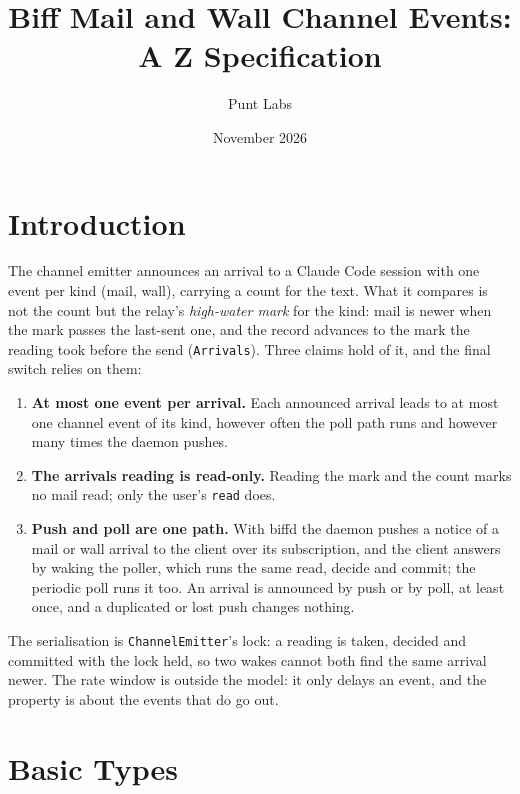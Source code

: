 \documentclass[a4paper,10pt,fleqn]{article}
\begin{document}
\title{Biff Mail and Wall Channel Events: A Z Specification}
\author{Punt Labs}
\date{November 2026}
\maketitle

\section{Introduction}

The channel emitter announces an arrival to a Claude Code session with one
event per kind (mail, wall), carrying a count for the text.  What it compares is
not the count but the relay's \emph{high-water mark} for the kind: mail is newer
when the mark passes the last-sent one, and the record advances to the mark the
reading took before the send (\texttt{Arrivals}).  Three claims hold of it, and
the final switch relies on them:

\begin{enumerate}
  \item \textbf{At most one event per arrival.}  Each announced arrival leads to
    at most one channel event of its kind, however often the poll path runs and
    however many times the daemon pushes.
  \item \textbf{The arrivals reading is read-only.}  Reading the mark and the count
    marks no mail read; only the user's \texttt{read} does.
  \item \textbf{Push and poll are one path.}  With biffd the daemon pushes a
    notice of a mail or wall arrival to the client over its subscription, and the
    client answers by waking the poller, which runs the same read, decide and
    commit; the periodic poll runs it too.  An arrival is announced by push or by
    poll, at least once, and a duplicated or lost push changes nothing.
\end{enumerate}

The serialisation is \texttt{ChannelEmitter}'s lock: a reading is taken, decided
and committed with the lock held, so two wakes cannot both find the same arrival
newer.  The rate window is outside the model: it only delays an event, and the
property is about the events that do go out.

\section{Basic Types}
\end{document}
